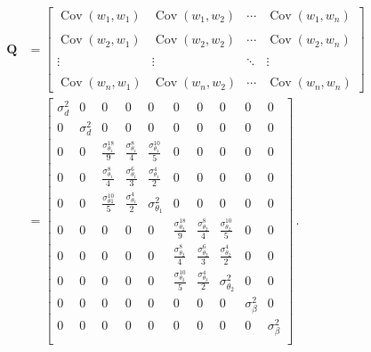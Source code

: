 \begin{equation}
\begin{split}
\mathbf{Q} &= \begin{bmatrix}
 \operatorname{Cov}(w_1,w_1) & \operatorname{Cov}(w_1,w_2) & \cdots & \operatorname{Cov}(w_1,w_n) \\ \\
 \operatorname{Cov}(w_2,w_1) & \operatorname{Cov}(w_2,w_2) & \cdots & \operatorname{Cov}(w_2,w_n) \\ \\
 \vdots & \vdots & \ddots & \vdots \\ \\
 \operatorname{Cov}(w_n,w_1) & \operatorname{Cov}(w_n,w_2) & \cdots & \operatorname{Cov}(w_n,w_n)
\end{bmatrix} \\
&= \begin{bmatrix}
  \sigma^2_d & 0 & 0 & 0 & 0 & 0 & 0 & 0 & 0 & 0\\
  0 & \sigma^2_d & 0 & 0 & 0 & 0 & 0 & 0 & 0 & 0\\
  0 & 0 & \frac{\sigma^{18}_{\theta_1}}{9} & \frac{\sigma^8_{\theta_1}}{4} & \frac{\sigma^{10}_{\theta_1}}{5} & 0 & 0 & 0 & 0 & 0\\
  0 & 0 & \frac{\sigma^8_{\theta_1}}{4} & \frac{\sigma^6_{\theta_1}}{3} & \frac{\sigma^4_{\theta_1}}{2} & 0 & 0 & 0 & 0 & 0\\
  0 & 0 & \frac{\sigma^{10}_{\theta 1}}{5} & \frac{\sigma^4_{\theta_1}}{2} & \sigma^2_{\theta_1} & 0 & 0 & 0 & 0 & 0\\
  0 & 0 & 0 & 0 & 0 & \frac{\sigma^{18}_{\theta_2}}{9} & \frac{\sigma^8_{\theta_2}}{4} & \frac{\sigma^{10}_{\theta_2}}{5} & 0 & 0\\
  0 & 0 & 0 & 0 & 0 & \frac{\sigma^8_{\theta_2}}{4} & \frac{\sigma^6_{\theta_2}}{3} & \frac{\sigma^4_{\theta_2}}{2} & 0 & 0\\
  0 & 0 & 0 & 0 & 0 & \frac{\sigma^{10}_{\theta_2}}{5} & \frac{\sigma^4_{\theta_2}}{2} & \sigma^2_{\theta_2} & 0 & 0\\
  0 & 0 & 0 & 0 & 0 & 0 & 0 & 0 & \sigma^2_{\beta} & 0\\
  0 & 0 & 0 & 0 & 0 & 0 & 0 & 0 & 0 & \sigma^2_{\beta}\\
\end{bmatrix}\,.
\end{split}
\end{equation}


